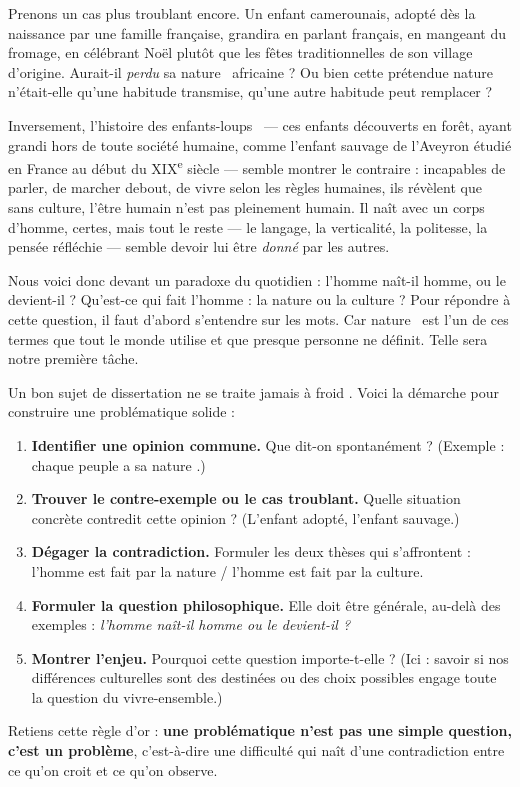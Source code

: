 \documentclass[11pt]{article}
\newcommand{\cle}[1]{{\popxbold\color{popdark}#1}}
\begin{document}
Prenons un cas plus troublant encore. Un enfant camerounais, adopté dès la naissance par une famille française, grandira en parlant français, en mangeant du fromage, en célébrant Noël plutôt que les fêtes traditionnelles de son village d'origine. Aurait-il \emph{perdu} sa \guillemotleft nature \guillemotright\ africaine ? Ou bien cette prétendue nature n'était-elle qu'une habitude transmise, qu'une autre habitude peut remplacer ?

Inversement, l'histoire des \guillemotleft enfants-loups \guillemotright\ --- ces enfants découverts en forêt, ayant grandi hors de toute société humaine, comme l'enfant sauvage de l'Aveyron étudié en France au début du XIX\textsuperscript{e} siècle --- semble montrer le contraire : incapables de parler, de marcher debout, de vivre selon les règles humaines, ils révèlent que sans culture, l'être humain n'est pas pleinement humain. Il naît avec un corps d'homme, certes, mais tout le reste --- le langage, la verticalité, la politesse, la pensée réfléchie --- semble devoir lui être \emph{donné} par les autres.

Nous voici donc devant un paradoxe du quotidien : l'homme naît-il homme, ou le devient-il ? Qu'est-ce qui fait l'homme : la \cle{nature} ou la \cle{culture} ? Pour répondre à cette question, il faut d'abord s'entendre sur les mots. Car \guillemotleft nature \guillemotright\ est l'un de ces termes que tout le monde utilise et que presque personne ne définit. Telle sera notre première tâche.

\begin{methode}
Un bon sujet de dissertation ne se traite jamais \guillemotleft à froid \guillemotright. Voici la démarche pour construire une problématique solide :
\begin{enumerate}
\item \textbf{Identifier une opinion commune.} Que dit-on spontanément ? (Exemple : \guillemotleft chaque peuple a sa nature \guillemotright.)
\item \textbf{Trouver le contre-exemple ou le cas troublant.} Quelle situation concrète contredit cette opinion ? (L'enfant adopté, l'enfant sauvage.)
\item \textbf{Dégager la contradiction.} Formuler les deux thèses qui s'affrontent : l'homme est fait par la nature / l'homme est fait par la culture.
\item \textbf{Formuler la question philosophique.} Elle doit être générale, au-delà des exemples : \emph{l'homme naît-il homme ou le devient-il ?}
\item \textbf{Montrer l'enjeu.} Pourquoi cette question importe-t-elle ? (Ici : savoir si nos différences culturelles sont des destinées ou des choix possibles engage toute la question du vivre-ensemble.)
\end{enumerate}
Retiens cette règle d'or : \textbf{une problématique n'est pas une simple question, c'est un problème}, c'est-à-dire une difficulté qui naît d'une contradiction entre ce qu'on croit et ce qu'on observe.
\end{methode}
\end{document}
